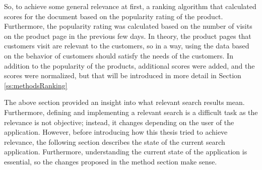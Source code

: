 So, to achieve some general relevance at first, a ranking algorithm that calculated
scores for the document based on the popularity rating of the product.
Furthermore, the popularity rating was calculated based on the number of visits on
the product page in the previous few days.
In theory, the product pages that customers visit are relevant to the customers, so in a way,
using the data based on the behavior of customers should satisfy the needs of the customers.
In addition to the popularity of the products, additional scores were added, and the scores were normalized,
but that will be introduced in more detail in Section \ref{ss:methodsRanking}


The above section provided an insight into what relevant search results mean.
Furthermore, defining and implementing a relevant search is a difficult task as
the relevance is not objective; instead, it changes depending on the user of the application.
However, before introducing how this thesis tried to achieve relevance, the following section 
describes the state of the current search application.
Furthermore, understanding the current state of the application is essential, so the 
changes proposed in the method section make sense.


